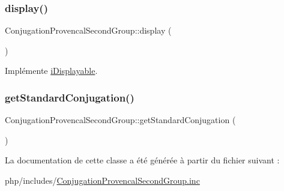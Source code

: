 \subsubsection{\texorpdfstring{display()}{display()}}
{\footnotesize\ttfamily Conjugation\+Provencal\+Second\+Group\+::display (\begin{DoxyParamCaption}{ }\end{DoxyParamCaption})}



Implémente \hyperlink{interfacei_displayable_a0264fd455c876e897f754cf85f1681ca}{i\+Displayable}.

\hypertarget{class_conjugation_provencal_second_group_abe567700b32c8867ff9a5cd4d9777aec}{}\label{class_conjugation_provencal_second_group_abe567700b32c8867ff9a5cd4d9777aec} 
\subsubsection{\texorpdfstring{get\+Standard\+Conjugation()}{getStandardConjugation()}}
{\footnotesize\ttfamily Conjugation\+Provencal\+Second\+Group\+::get\+Standard\+Conjugation (\begin{DoxyParamCaption}{ }\end{DoxyParamCaption})\hspace{0.3cm}{\ttfamily [protected]}}



La documentation de cette classe a été générée à partir du fichier suivant \+:\begin{DoxyCompactItemize}
\item 
php/includes/\hyperlink{_conjugation_provencal_second_group_8inc}{Conjugation\+Provencal\+Second\+Group.\+inc}\end{DoxyCompactItemize}
